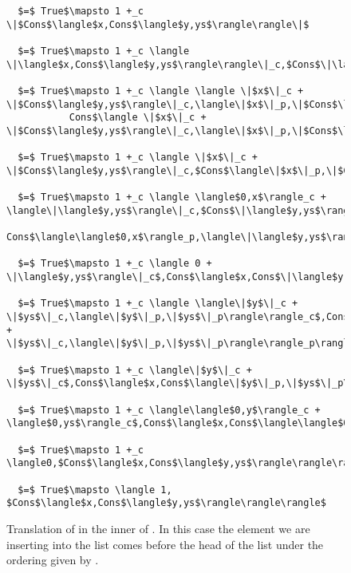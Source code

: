\begin{figure}[H]
\caption{Translation of  in the inner  of .
In this case the element we are inserting into the list comes before the head of the list under the ordering given by .
}
\label{fig:insert_true}
\begin{lstlisting}
  $=$ True$\mapsto 1 +_c \|$Cons$\langle$x,Cons$\langle$y,ys$\rangle\rangle\|$

  $=$ True$\mapsto 1 +_c \langle \|\langle$x,Cons$\langle$y,ys$\rangle\rangle\|_c,$Cons$\|\langle$x,Cons$\langle$y,ys$\rangle\rangle\|_p\rangle$

  $=$ True$\mapsto 1 +_c \langle \langle \|$x$\|_c + \|$Cons$\langle$y,ys$\rangle\|_c,\langle\|$x$\|_p,\|$Cons$\langle$y,ys$\rangle\|_p\rangle\rangle_c$,
           Cons$\langle \|$x$\|_c + \|$Cons$\langle$y,ys$\rangle\|_c,\langle\|$x$\|_p,\|$Cons$\langle$y,ys$\rangle\|_p\rangle\rangle_p\rangle$

  $=$ True$\mapsto 1 +_c \langle \|$x$\|_c + \|$Cons$\langle$y,ys$\rangle\|_c,$Cons$\langle\|$x$\|_p,\|$Cons$\langle$y,ys$\rangle\|_p\rangle\rangle$

  $=$ True$\mapsto 1 +_c \langle \langle$0,x$\rangle_c + \langle\|\langle$y,ys$\rangle\|_c,$Cons$\|\langle$y,ys$\rangle\|_p\rangle_c$,
          Cons$\langle\langle$0,x$\rangle_p,\langle\|\langle$y,ys$\rangle\|_c,$Cons$\|\langle$y,ys$\rangle\|_p\rangle_p\rangle\rangle$

  $=$ True$\mapsto 1 +_c \langle 0 + \|\langle$y,ys$\rangle\|_c$,Cons$\langle$x,Cons$\|\langle$y,ys$\rangle\|_p\rangle\rangle$

  $=$ True$\mapsto 1 +_c \langle \langle\|$y$\|_c + \|$ys$\|_c,\langle\|$y$\|_p,\|$ys$\|_p\rangle\rangle_c$,Cons$\langle$x,Cons$\langle\|$y$\|_c + \|$ys$\|_c,\langle\|$y$\|_p,\|$ys$\|_p\rangle\rangle_p\rangle\rangle$

  $=$ True$\mapsto 1 +_c \langle\|$y$\|_c + \|$ys$\|_c$,Cons$\langle$x,Cons$\langle\|$y$\|_p,\|$ys$\|_p\rangle\rangle\rangle$

  $=$ True$\mapsto 1 +_c \langle\langle$0,y$\rangle_c + \langle$0,ys$\rangle_c$,Cons$\langle$x,Cons$\langle\langle$0,y$\rangle_p,\langle$0,ys$\rangle_p\rangle\rangle\rangle$

  $=$ True$\mapsto 1 +_c \langle0,$Cons$\langle$x,Cons$\langle$y,ys$\rangle\rangle\rangle$

  $=$ True$\mapsto \langle 1, $Cons$\langle$x,Cons$\langle$y,ys$\rangle\rangle\rangle$
\end{lstlisting}
\end{figure}

